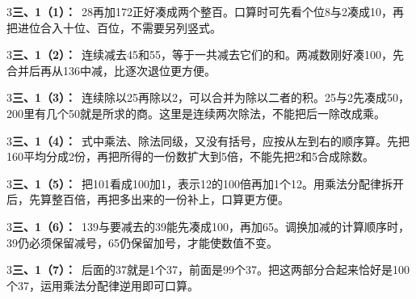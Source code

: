 \documentclass[multi=snippet,border={5bp 20bp 5bp 5bp}]{standalone}
\newenvironment{snippet}[3]{\begin{minipage}{#1bp}\color{answerred}\fontsize{#2}{#3}\selectfont\raggedright}{\end{minipage}}
\begin{document}
\begin{snippet}{505}{11.5}{14}\begin{multicols}{3}\raggedcolumns \textbf{三、1（1）：}\ 28再加172正好凑成两个整百。口算时可先看个位8与2凑成10，再把进位合入十位、百位，不需要另列竖式。\end{multicols}\end{snippet}
\begin{snippet}{505}{11.5}{14}\begin{multicols}{3}\raggedcolumns \textbf{三、1（2）：}\ 连续减去45和55，等于一共减去它们的和。两减数刚好凑100，先合并后再从136中减，比逐次退位更方便。\end{multicols}\end{snippet}
\begin{snippet}{505}{11.5}{14}\begin{multicols}{3}\raggedcolumns \textbf{三、1（3）：}\ 连续除以25再除以2，可以合并为除以二者的积。25与2先凑成50，200里有几个50就是所求的商。这里是连续两次除法，不能把后一除改成乘。\end{multicols}\end{snippet}
\begin{snippet}{505}{11.5}{14}\begin{multicols}{3}\raggedcolumns \textbf{三、1（4）：}\ 式中乘法、除法同级，又没有括号，应按从左到右的顺序算。先把160平均分成2份，再把所得的一份数扩大到5倍，不能先把2和5合成除数。\end{multicols}\end{snippet}
\begin{snippet}{505}{11.5}{14}\begin{multicols}{3}\raggedcolumns \textbf{三、1（5）：}\ 把101看成100加1，表示12的100倍再加1个12。用乘法分配律拆开后，先算整百倍，再把多出来的一份补上，口算更方便。\end{multicols}\end{snippet}
\begin{snippet}{505}{11.5}{14}\begin{multicols}{3}\raggedcolumns \textbf{三、1（6）：}\ 139与要减去的39能先凑成100，再加65。调换加减的计算顺序时，39仍必须保留减号，65仍保留加号，才能使数值不变。\end{multicols}\end{snippet}
\begin{snippet}{505}{11.5}{14}\begin{multicols}{3}\raggedcolumns \textbf{三、1（7）：}\ 后面的37就是1个37，前面是99个37。把这两部分合起来恰好是100个37，运用乘法分配律逆用即可口算。\end{multicols}\end{snippet}
\end{document}
